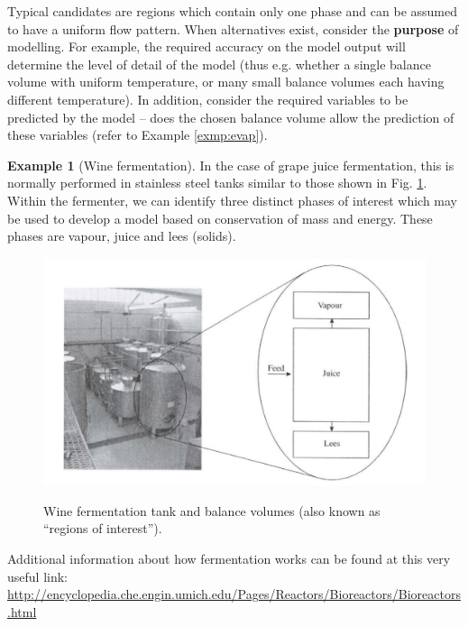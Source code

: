 \documentclass[a4paper,11pt]{article}
\theoremstyle{definition}
\newtheorem{exmp}{Example}[section]
\begin{document}
Typical candidates are regions which contain only one phase and can be assumed to have a uniform flow pattern.
When alternatives exist, consider the \textbf{purpose} of modelling. For example, the required accuracy on the model output
will determine the level of detail of the model (thus e.g. whether a single balance volume with uniform temperature, 
or many small balance volumes each having different temperature). In addition, consider the required variables to be predicted
by the model -- does the chosen balance volume allow the prediction of these variables (refer to Example \ref{exmp:evap}).

\begin{exmp}[Wine fermentation]
\label{exmp:wine_ferm}
In the case of grape juice fermentation, this is normally performed in stainless steel tanks similar to those shown in Fig. \ref{fig:wine_ferm}.
Within the fermenter, we can identify three distinct phases of interest which may be
used to develop a model based on conservation of mass and energy. These phases
are vapour, juice and lees (solids).

\begin{figure} [!h]
 \begin{center}
	\includegraphics[width=.7\textwidth]{WineFerment}\\
 \end{center}
 \caption{Wine fermentation tank and balance volumes (also known as ``regions of interest'').} 
 \label{fig:wine_ferm}
\end{figure}

Additional information about how fermentation works can be found at this very useful link:
\url{http://encyclopedia.che.engin.umich.edu/Pages/Reactors/Bioreactors/Bioreactors.html}

\end{exmp}
\end{document}
